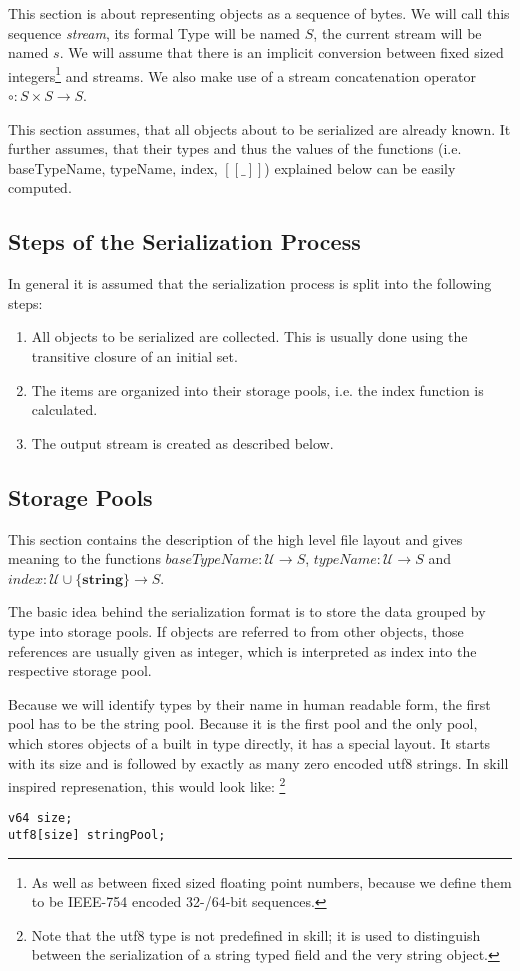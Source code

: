 \documentclass[a4paper,10pt]{article}
\newcommand{\den}[1]{[\![#1]\!]}
\begin{document}
This section is about representing objects as a sequence of bytes. We will call this sequence \textit{stream}, its formal Type will be named $S$, the current stream will be named $s$. We will assume that there is an implicit conversion between fixed sized integers\footnote{As well as between fixed sized floating point numbers, because we define them to be IEEE-754 encoded 32-/64-bit sequences.} and streams. We also make use of a stream concatenation operator $\circ : S \times S → S$.

This section assumes, that all objects about to be serialized are already known. It further assumes, that their types and thus the values of the functions (i.e. baseTypeName, typeName, index, $\den{\_}$) explained below can be easily computed.


\subsection{Steps of the Serialization Process}

In general it is assumed that the serialization process is split into the following steps:
\begin{enumerate}
 \item All objects to be serialized are collected. This is usually done using the transitive closure of an initial set.
 
 \item The items are organized into their storage pools, i.e. the index function is calculated.
 
 \item The output stream is created as described below.
\end{enumerate}

\subsection{Storage Pools}

This section contains the description of the high level file layout and gives meaning to the functions $baseTypeName: \mathcal{U} → S$, $typeName: \mathcal{U} → S$ and $index: \mathcal{U}\cup\{\textbf{string}\} → S$.

The basic idea behind the serialization format is to store the data grouped by type into storage pools. If objects are referred to from other objects, those references are usually given as integer, which is interpreted as index into the respective storage pool.

Because we will identify types by their name in human readable form, the first pool has to be the string pool. Because it is the first pool and the only pool, which stores objects of a built in type directly, it has a special layout. It starts with its size and is followed by exactly as many zero encoded utf8 strings. In skill inspired represenation, this would look like: \footnote{Note that the utf8 type is not predefined in skill; it is used to distinguish between the serialization of a string typed field and the very string object.}
\begin{verbatim}
v64 size;
utf8[size] stringPool;
\end{verbatim}
\end{document}
